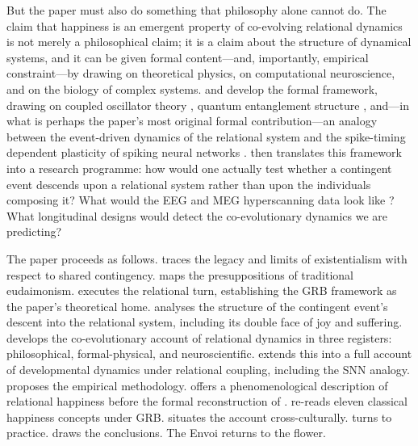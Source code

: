 But the paper must also do something that philosophy alone cannot do. The claim that happiness is an emergent property of co-evolving relational dynamics is not merely a philosophical claim; it is a claim about the structure of dynamical systems, and it can be given formal content---and, importantly, empirical constraint---by drawing on theoretical physics, on computational neuroscience, and on the biology of complex systems.  and  develop the formal framework, drawing on coupled oscillator theory \parencite{kuramoto1984}, quantum entanglement structure \parencite{einstein1935}, and---in what is perhaps the paper's most original formal contribution---an analogy between the event-driven dynamics of the relational system and the spike-timing dependent plasticity of spiking neural networks \parencite{maass1997,gerstner1996}.  then translates this framework into a research programme: how would one actually test whether a contingent event descends upon a relational system rather than upon the individuals composing it? What would the EEG and MEG hyperscanning data look like \parencite{hasson2012,liu2023}? What longitudinal designs would detect the co-evolutionary dynamics we are predicting?

The paper proceeds as follows.  traces the legacy and limits of existentialism with respect to shared contingency.  maps the presuppositions of traditional eudaimonism.  executes the relational turn, establishing the GRB framework as the paper's theoretical home.  analyses the structure of the contingent event's descent into the relational system, including its double face of joy and suffering.  develops the co-evolutionary account of relational dynamics in three registers: philosophical, formal-physical, and neuroscientific.  extends this into a full account of developmental dynamics under relational coupling, including the SNN analogy.  proposes the empirical methodology.  offers a phenomenological description of relational happiness before the formal reconstruction of .  re-reads eleven classical happiness concepts under GRB.  situates the account cross-culturally.  turns to practice.  draws the conclusions. The Envoi returns to the flower.

